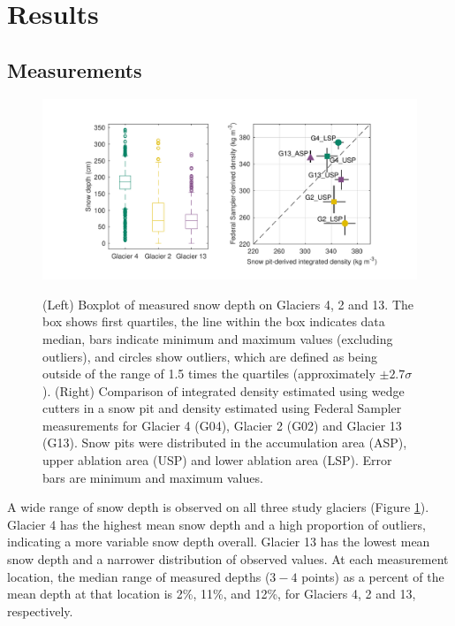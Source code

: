 \documentclass[twocolumn, letterpaper]{igs}
\begin{document}
\section{Results}

\subsection{Measurements}

\begin{figure}
	\centering
	\includegraphics[width =\textwidth]{DepthBoxplot_SPvsFS.pdf}\\
	\caption{(Left) Boxplot of measured snow depth on Glaciers 4, 2 and 13. The box shows first quartiles, the line within the box indicates data median, bars indicate minimum and maximum values (excluding outliers), and circles show outliers, which are defined as being outside of the range of 1.5 times the quartiles (approximately $\pm2.7\sigma$). (Right) Comparison of integrated density estimated using wedge cutters in a snow pit and density estimated using Federal Sampler measurements for Glacier 4 (G04), Glacier 2 (G02) and Glacier 13 (G13). Snow pits were distributed in the accumulation area (ASP), upper ablation area (USP) and lower ablation area (LSP). Error bars are minimum and maximum values.}
	\label{fig:DepthBoxplot_SPvsFS}
\end{figure}

A wide range of snow depth is observed on all three study glaciers (Figure \ref{fig:DepthBoxplot_SPvsFS}). Glacier 4 has the highest mean snow depth and a high proportion of outliers, indicating a more variable snow depth overall. Glacier 13 has the lowest mean snow depth and a narrower distribution of observed values. At each measurement location, the median range of measured depths ($3-4$ points) as a percent of the mean depth at that location is 2\%, 11\%, and 12\%, for Glaciers 4, 2 and 13, respectively. 
\end{document}
